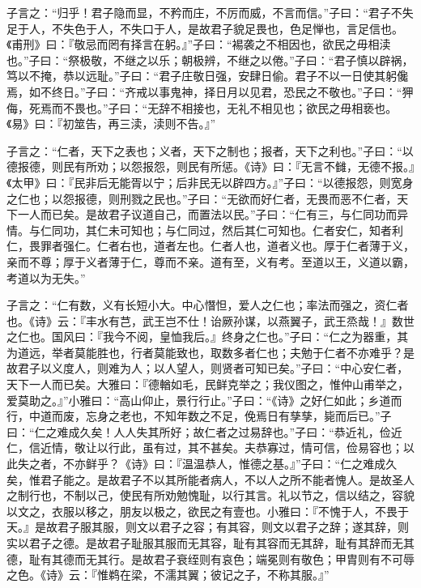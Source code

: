 \documentclass[]{article}
\begin{document}
子言之：``归乎！君子隐而显，不矜而庄，不厉而威，不言而信。''子曰：``君子不失足于人，不失色于人，不失口于人，是故君子貌足畏也，色足惮也，言足信也。《甫刑》曰：『敬忌而罔有择言在躬。』''子曰：``裼袭之不相因也，欲民之毋相渎也。''子曰：``祭极敬，不继之以乐；朝极辨，不继之以倦。''子曰：``君子慎以辟祸，笃以不掩，恭以远耻。''子曰：``君子庄敬日强，安肆日偷。君子不以一日使其躬儳焉，如不终日。''子曰：``齐戒以事鬼神，择日月以见君，恐民之不敬也。''子曰：``狎侮，死焉而不畏也。''子曰：``无辞不相接也，无礼不相见也；欲民之毋相亵也。《易》曰：『初筮告，再三渎，渎则不告。』''

子言之：``仁者，天下之表也；义者，天下之制也；报者，天下之利也。''子曰：``以德报德，则民有所劝；以怨报怨，则民有所惩。《诗》曰：『无言不雠，无德不报。』《太甲》曰：『民非后无能胥以宁；后非民无以辟四方。』''子曰：``以德报怨，则宽身之仁也；以怨报德，则刑戮之民也。''子曰：``无欲而好仁者，无畏而恶不仁者，天下一人而已矣。是故君子议道自己，而置法以民。''子曰：``仁有三，与仁同功而异情。与仁同功，其仁未可知也；与仁同过，然后其仁可知也。仁者安仁，知者利仁，畏罪者强仁。仁者右也，道者左也。仁者人也，道者义也。厚于仁者薄于义，亲而不尊；厚于义者薄于仁，尊而不亲。道有至，义有考。至道以王，义道以霸，考道以为无失。''

子言之：``仁有数，义有长短小大。中心憯怛，爱人之仁也；率法而强之，资仁者也。《诗》云：『丰水有芑，武王岂不仕！诒厥孙谋，以燕翼子，武王烝哉！』数世之仁也。国风曰：『我今不阅，皇恤我后。』终身之仁也。''子曰：``仁之为器重，其为道远，举者莫能胜也，行者莫能致也，取数多者仁也；夫勉于仁者不亦难乎？是故君子以义度人，则难为人；以人望人，则贤者可知已矣。''子曰：``中心安仁者，天下一人而已矣。大雅曰：『德輶如毛，民鲜克举之；我仪图之，惟仲山甫举之，爱莫助之。』''小雅曰：``高山仰止，景行行止。''子曰：``《诗》之好仁如此；乡道而行，中道而废，忘身之老也，不知年数之不足，俛焉日有孳孳，毙而后已。''子曰：``仁之难成久矣！人人失其所好；故仁者之过易辞也。''子曰：``恭近礼，俭近仁，信近情，敬让以行此，虽有过，其不甚矣。夫恭寡过，情可信，俭易容也；以此失之者，不亦鲜乎？《诗》曰：『温温恭人，惟德之基。』''子曰：``仁之难成久矣，惟君子能之。是故君子不以其所能者病人，不以人之所不能者愧人。是故圣人之制行也，不制以己，使民有所劝勉愧耻，以行其言。礼以节之，信以结之，容貌以文之，衣服以移之，朋友以极之，欲民之有壹也。小雅曰：『不愧于人，不畏于天。』是故君子服其服，则文以君子之容；有其容，则文以君子之辞；遂其辞，则实以君子之德。是故君子耻服其服而无其容，耻有其容而无其辞，耻有其辞而无其德，耻有其德而无其行。是故君子衰绖则有哀色；端冕则有敬色；甲胄则有不可辱之色。《诗》云：『惟鹈在梁，不濡其翼；彼记之子，不称其服。』''
\end{document}
